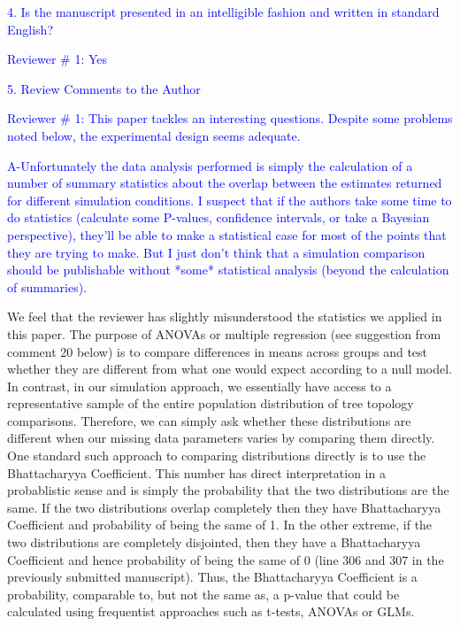 \documentclass[11pt]{letter}
\begin{document}
\begin{letter}{}
\textcolor{blue}{4. Is the manuscript presented in an intelligible fashion and written in standard English?}

\textcolor{blue}{Reviewer $\#$ 1: Yes}

\textcolor{blue}{5. Review Comments to the Author}

\textcolor{blue}{Reviewer $\#$ 1: This paper tackles an interesting questions. Despite some problems noted below, the experimental design seems adequate.}


\textcolor{blue}{A-Unfortunately the data analysis performed is simply the calculation of a number of summary statistics about the overlap between the estimates returned for different simulation conditions. I suspect that if the authors take some time to do statistics (calculate some P-values, confidence intervals, or take a Bayesian perspective), they'll be able to make a statistical case for most of the points that they are trying to make. But I just don't think that a simulation comparison should be publishable without *some* statistical analysis (beyond the calculation of summaries).}

We feel that the reviewer has slightly misunderstood the statistics we applied in this paper. The purpose of ANOVAs or multiple regression (see suggestion from comment 20 below) is to compare differences in means across groups and test whether they are different from what one would expect according to a null model. In contrast, in our simulation approach, we essentially have access to a representative sample of the entire population distribution of tree topology comparisons. Therefore, we can simply ask whether these distributions are different when our missing data parameters varies by comparing them directly. One standard such approach to comparing distributions directly is to use the Bhattacharyya Coefficient. This number has direct interpretation in a probablistic sense and is simply the probability that the two distributions are the same. If the two distributions overlap completely then they have Bhattacharyya Coefficient and probability of being the same of 1. In the other extreme, if the two distributions are completely disjointed, then they have a Bhattacharyya Coefficient and hence probability of being the same of 0 (line 306 and 307 in the previously submitted manuscript). Thus, the Bhattacharyya Coefficient is a probability, comparable to, but not the same as, a p-value that could be calculated using frequentist approaches such as t-tests, ANOVAs or GLMs.


\end{letter}
\end{document}

